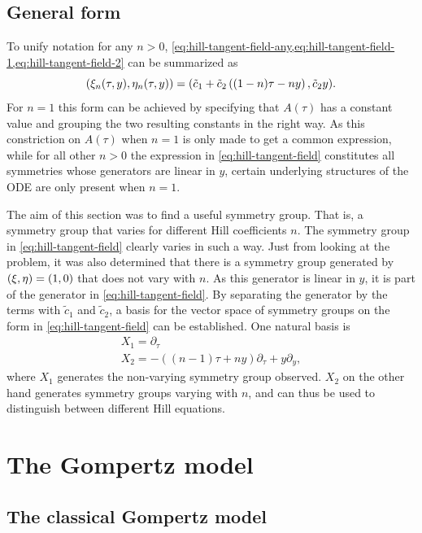 \subsection{General form}

To unify notation for any \(n>0\), \cref{eq:hill-tangent-field-any,eq:hill-tangent-field-1,eq:hill-tangent-field-2} can be summarized as
\begin{equation} \label{eq:hill-tangent-field}
  \pqty{\xi_n(\tau,y),\eta_n(\tau,y)} = 
  \pqty{\tilde{c}_1 + \tilde{c}_2 \left( (1-n) \tau - n y \right), \tilde{c}_2 y}.
\end{equation}
For \(n=1\) this form can be achieved by specifying that \(A(\tau)\) has a constant value and grouping the two resulting constants in the right way.
As this constriction on \(A(\tau)\) when \(n=1\) is only made to get a common expression, while for all other \(n>0\) the expression in \cref{eq:hill-tangent-field} constitutes all symmetries whose generators are linear in \(y\), certain underlying structures of the ODE are only present when \(n=1\). %

The aim of this section was to find a useful symmetry group.
That is, a symmetry group that varies for different Hill coefficients \(n\).
The symmetry group in \cref{eq:hill-tangent-field} clearly varies in such a way.
Just from looking at the problem, it was also determined that there is a symmetry group generated by \(\pqty{\xi,\eta} = \pqty{1,0}\) that does not vary with \(n\).
As this generator is linear in \(y\), it is part of the generator in \cref{eq:hill-tangent-field}.
By separating the generator by the terms with \(\tilde{c}_1\) and \(\tilde{c}_2\), a basis for the vector space of symmetry groups on the form in \cref{eq:hill-tangent-field} can be established.
One natural basis is
\begin{align*}
  X_1 = \partial_\tau \\
  X_2 = - \left( (n-1) \tau + n y \right) \partial_\tau + y \partial_y,
\end{align*}
where \(X_1\) generates the non-varying symmetry group observed.
\(X_2\) on the other hand generates symmetry groups varying with \(n\), and can thus be used to distinguish between different Hill equations.

\section{The Gompertz model}

\subsection{The classical Gompertz model}

